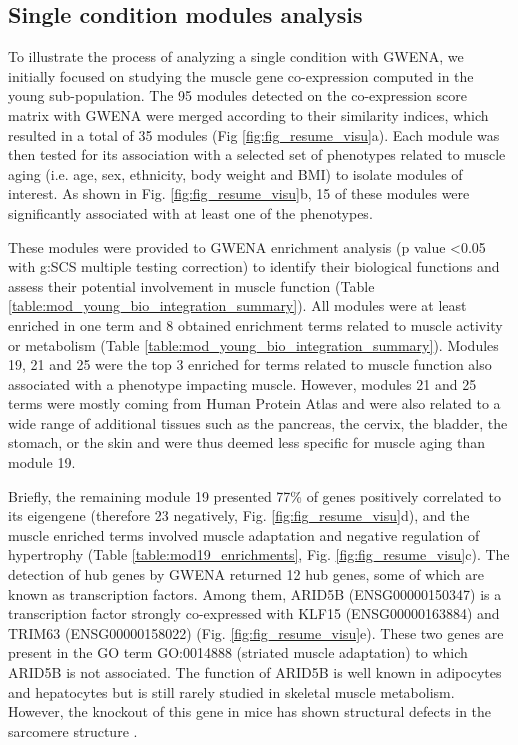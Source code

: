 \subsection{Single condition modules analysis}

To illustrate the process of analyzing a single condition with GWENA, we initially focused on studying the muscle gene co-expression computed in the young sub-population. The 95 modules detected on the co-expression score matrix with GWENA were merged according to their similarity indices, which resulted in a total of 35 modules (Fig \ref{fig:fig_resume_visu}a). Each module was then tested for its association with a selected set of phenotypes related to muscle aging (i.e. age, sex, ethnicity, body weight and BMI) to isolate modules of interest. As shown in Fig. \ref{fig:fig_resume_visu}b, 15 of these modules were significantly associated with at least one of the phenotypes.

These modules were provided to GWENA enrichment analysis (p value \textless 0.05 with g:SCS multiple testing correction) to identify their biological functions and assess their potential involvement in muscle function (Table \ref{table:mod_young_bio_integration_summary}). All modules were at least enriched in one term and 8 obtained enrichment terms related to muscle activity or metabolism (Table \ref{table:mod_young_bio_integration_summary}). Modules 19, 21 and 25 were the top 3 enriched for terms related to muscle function also associated with a phenotype impacting muscle. However, modules 21 and 25 terms were mostly coming from Human Protein Atlas and were also related to a wide range of additional tissues such as the pancreas, the cervix, the bladder, the stomach, or the skin and were thus deemed less specific for muscle aging than module 19. 

Briefly, the remaining module 19 presented 77\% of genes positively correlated to its eigengene (therefore 23 negatively, Fig. \ref{fig:fig_resume_visu}d), and the muscle enriched terms involved muscle adaptation and negative regulation of hypertrophy (Table \ref{table:mod19_enrichments}, Fig. \ref{fig:fig_resume_visu}c). The detection of hub genes by GWENA returned 12 hub genes, some of which are known as transcription factors. Among them, ARID5B (ENSG00000150347) is a transcription factor strongly co-expressed with KLF15 (ENSG00000163884) and TRIM63 (ENSG00000158022) (Fig. \ref{fig:fig_resume_visu}e). These two genes are present in the GO term GO:0014888 (striated muscle adaptation) to which ARID5B is not associated. The function of ARID5B is well known in adipocytes and hepatocytes but is still rarely studied in skeletal muscle metabolism. However, the knockout of this gene in mice has shown structural defects in the sarcomere structure .


